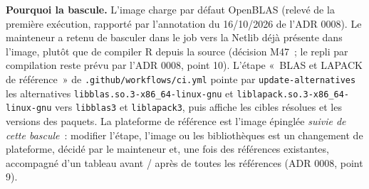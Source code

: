 \documentclass[a4paper,11pt]{article}
\newcommand{\code}[1]{\texttt{\small #1}}
\begin{document}
\medskip
\textbf{Pourquoi la bascule.} L'image charge par défaut OpenBLAS (relevé de la
première exécution, rapporté par l'annotation du 16/10/2026 de l'ADR 0008). Le mainteneur a retenu
de basculer dans le job vers la Netlib déjà présente dans l'image, plutôt que
de compiler R depuis la source (décision M47~; le repli par compilation reste
prévu par l'ADR 0008, point 10). L'étape «~BLAS et LAPACK de référence~» de
\code{.github/workflows/ci.yml} pointe par \code{update-alternatives} les
alternatives \code{libblas.so.3-x86\_64-linux-gnu} et
\code{liblapack.so.3-x86\_64-linux-gnu} vers \code{libblas3} et
\code{liblapack3}, puis affiche les cibles résolues et les versions des
paquets. La plateforme de référence est l'image épinglée \emph{suivie de cette
bascule}~: modifier l'étape, l'image ou les bibliothèques est un changement de
plateforme, décidé par le mainteneur et, une fois des références existantes,
accompagné d'un tableau avant / après de toutes les références (ADR 0008,
point 9).
\end{document}
